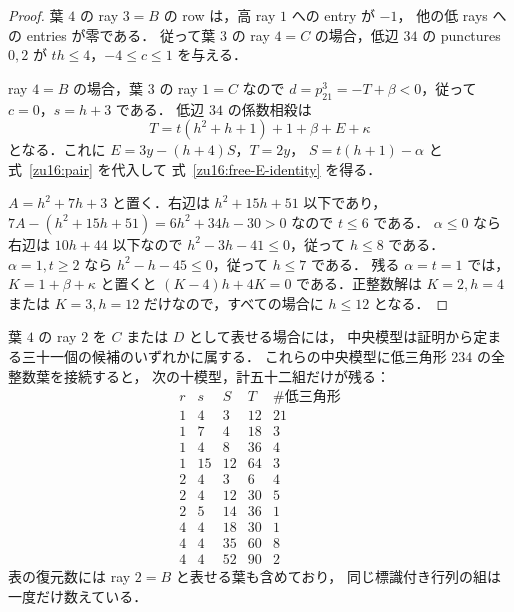 \begin{proof}
葉 $4$ の ray $3=B$ の row は，高 ray $1$ への entry が $-1$，
他の低 rays への entries が零である．
従って葉 $3$ の ray $4=C$ の場合，低辺 $34$ の punctures $0,2$ が
$th\le4$，$-4\le c\le1$ を与える．

ray $4=B$ の場合，葉 $3$ の ray $1=C$ なので
$d=p^3_{21}=-T+\beta<0$，従って $c=0$，$s=h+3$ である．
低辺 $34$ の係数相殺は
\[
 T=t(h^2+h+1)+1+\beta+E+\kappa
\]
となる．これに $E=3y-(h+4)S$，$T=2y$，
$S=t(h+1)-\alpha$ と式~\eqref{zu16:pair} を代入して
式~\eqref{zu16:free-E-identity} を得る．

$A=h^2+7h+3$ と置く．右辺は
$h^2+15h+51$ 以下であり，$7A-(h^2+15h+51)=6h^2+34h-30>0$
なので $t\le6$ である．
$\alpha\le0$ なら右辺は $10h+44$ 以下なので
$h^2-3h-41\le0$，従って $h\le8$ である．
$\alpha=1,t\ge2$ なら $h^2-h-45\le0$，従って $h\le7$ である．
残る $\alpha=t=1$ では，$K=1+\beta+\kappa$ と置くと
$(K-4)h+4K=0$ である．正整数解は $K=2,h=4$ または $K=3,h=12$
だけなので，すべての場合に $h\le12$ となる．
\end{proof}

\begin{proposition}[非 $B$ 表現の完全な有限候補集合]
\label{zu16:nonB-finite}
葉 $4$ の ray $2$ を $C$ または $D$ として表せる場合には，
中央模型は証明から定まる三十一個の候補のいずれかに属する．
これらの中央模型に低三角形 $234$ の全整数葉を接続すると，
次の十模型，計五十二組だけが残る：
\[
\begin{array}{rrrr|r}
 r&s&S&T&\#\text{低三角形}\\\hline
 1&4&3&12&21\\
 1&7&4&18&3\\
 1&4&8&36&4\\
 1&15&12&64&3\\
 2&4&3&6&4\\
 2&4&12&30&5\\
 2&5&14&36&1\\
 4&4&18&30&1\\
 4&4&35&60&8\\
 4&4&52&90&2
\end{array}
\]
表の復元数には ray $2=B$ と表せる葉も含めており，
同じ標識付き行列の組は一度だけ数えている．
\end{proposition}

